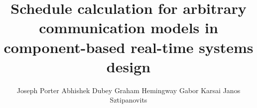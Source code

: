 %
%
%

\title{Schedule calculation for arbitrary communication models in component-based real-time systems design}
\author{Joseph Porter \hspace{0.15in}  Abhishek Dubey \hspace{0.15in} Graham Hemingway \hspace{0.15in} Gabor Karsai \hspace{0.15in} Janos Sztipanovits}

\maketitle
